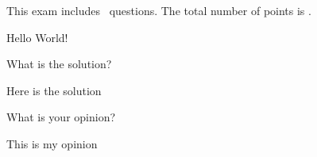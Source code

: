 \documentclass[letter, 11pt]{exam}
\begin{document}
\begin{minipage}{.8\textwidth}
This exam includes \numquestions\ questions. The total number of points is \numpoints.
\end{minipage}
Hello World!
\begin{questions} %
\question[2] What is the solution? %
\begin{solution}
Here is the solution
\end{solution}
\question[5] What is your opinion?
\begin{solution}
This is my opinion
\end{solution}
\end{questions}
\end{document}
